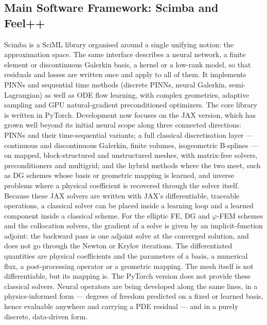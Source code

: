 
\subsection{Main Software Framework: Scimba and Feel++}


Scimba is a  SciML library organised around a  single unifying notion:
the  approximation  space.  The  same  interface  describes  a  neural
network, a finite element or discontinuous Galerkin basis, a kernel or
a low-rank  model, so that residuals  and losses are written  once and
apply to all of them.  It implements PINNs and sequential time methods
(discrete PINNs, neural Galerkin, semi-Lagrangian) as well as ODE flow
learning,  with   complex  geometries,   adaptive  sampling   and  GPU
natural-gradient  preconditioned  optimizers.   The  core  library  is
written in PyTorch. Development now  focuses on the JAX version, which
has grown well  beyond its initial neural scope  along three connected
directions: PINNs and their time-sequential variants; a full classical
discretisation layer  — continuous and discontinuous  Galerkin, finite
volumes,  isogeometric B-splines  —  on  mapped, block-structured  and
unstructured  meshes, with  matrix-free  solvers, preconditioners  and
multigrid;  and the  hybrid methods  where the  two meet,  such as  DG
schemes  whose basis  or  geometric mapping  is  learned, and  inverse
problems where a physical coefficient  is recovered through the solver
itself.   Because   these  JAX   solvers   are   written  with   JAX's
differentiable,  traceable  operations,  a  classical  solver  can  be
placed  inside a  learning  loop  and a  learned  component inside  a
classical  scheme.   For the  elliptic  FE, DG  and $\varphi$-FEM
schemes and the collocation solvers, the  gradient of a solve is given
by an implicit-function adjoint: the backward pass is one adjoint solve
at the converged  solution, and does not go through  the Newton or Krylov
iterations.   The  differentiated quantities  are physical  coefficients
and the parameters of a basis,  a numerical flux, a post-processing
operator  or a geometric  mapping.  The  mesh itself  is not
differentiable,  but its mapping is.  The PyTorch version does not
provide these classical solvers.  Neural
operators are  being  developed along  the  same  lines, in  a
physics-informed form ---  degrees of freedom predicted on  a fixed or
learned basis, hence evaluable anywhere and carrying a PDE residual ---
and in a purely discrete, data-driven form.

